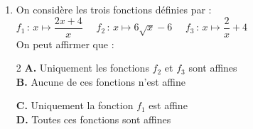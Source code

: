 \documentclass[a4paper,11pt]{article}
\begin{document}
\begin{seanceD}{}
\begin{enumerate}
\item On considère les trois fonctions définies  par : \\
        $f_1\,:\,x \longmapsto \dfrac{2x+4}{x}$\,\,\,\,\,\,\,\,$f_2\,:\,x \longmapsto 6\sqrt{x}-6$\,\,\,\,\,\,\,\,$f_3\,:\,x \longmapsto\dfrac{2}{x}+4$\\        On peut affirmer que :

\begin{multicols}{2}
\textbf{\textcolor{Couleur1}{A.}} Uniquement les fonctions $f_2$ et $f_3$ sont affines \\
 \textbf{\textcolor{Couleur1}{B.}} Aucune de ces fonctions n'est affine
 
  \columnbreak 
 
 \textbf{\textcolor{Couleur1}{C.}} Uniquement la fonction $f_1$ est affine \\
  \textbf{\textcolor{Couleur1}{D.}} Toutes ces fonctions sont affines
\end{multicols}


\end{enumerate}

\end{seanceD}
\end{document}

